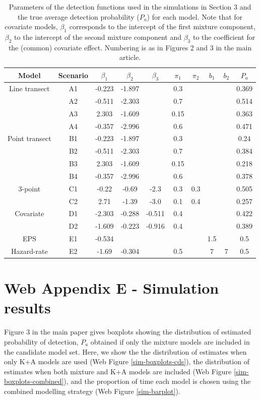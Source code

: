 \documentclass{report}
\begin{document}
\begin{table}[htbp]
\centering
\caption{Parameters of the detection functions used in the simulations in Section 3 and the true average detection probability ($P_a$) for each model. Note that for covariate models, $\beta_1$ corresponds to the intercept of the first mixture component, $\beta_2$ to the intercept of the second mixture component and $\beta_3$ to the coefficient for the (common) covariate effect. Numbering is as in Figures 2 and 3 in the main article.}
\begin{tabular}{c c c c c c c c c c}\\
\hline
\hline
Model & Scenario & $\beta_1$ & $\beta_2$ & $\beta_3$ & $\pi_1$ & $\pi_2$ & $b_1$ & $b_2$ & $P_a$ \\
\hline
\hline
Line transect & A1 & -0.223 & -1.897 & &  0.3 & & & & 0.369\\
 & A2 & -0.511 & -2.303 & &  0.7 & & & & 0.514\\
 & A3 &  2.303 & -1.609 & & 0.15 & & & & 0.363\\
 & A4 & -0.357 & -2.996 & &  0.6 & & & & 0.471\\
Point transect &B1 & -0.223 & -1.897 & &  0.3 & & & & 0.24\\
 & B2 & -0.511 & -2.303 & &  0.7 & & & & 0.384\\
 & B3 &  2.303 & -1.609 & & 0.15 & & & & 0.218\\
 & B4 & -0.357 & -2.996 & &  0.6 & & & & 0.378\\
3-point & C1 &  -0.22 &  -0.69 &  -2.3 & 0.3 & 0.3 & & & 0.505\\
 & C2 &   2.71 &  -1.39 &  -3.0 & 0.1 & 0.4 & & & 0.257\\
Covariate & D1 & -2.303 & -0.288 & -0.511 & 0.4 & & & & 0.422\\
 & D2 & -1.609 & -0.223 & -0.916 & 0.4 & & & & 0.389\\
 EPS & E1 & -0.534 & & & & & 1.5& & 0.5 \\
 Hazard-rate & E2 & -1.69 & -0.304 & & 0.5 & & 7 & 7 & 0.5\\
\hline
\end{tabular}
\label{partable}
\bigskip
\end{table}



\section*{Web Appendix E - Simulation results}

Figure 3 in the main paper gives boxplots showing the distribution of estimated probability of detection, $P_a$ obtained if only the mixture models are included in the candidate model set.  Here, we show the the distribution of estimates when only K+A models are used (Web Figure \ref{sim-boxplots-cds}), the distribution of estimates when both mixture and K+A models are included (Web Figure \ref{sim-boxplots-combined}), and the proportion of time each model is chosen using the combined modelling strategy (Web Figure \ref{sim-barplot}).
\end{document}
